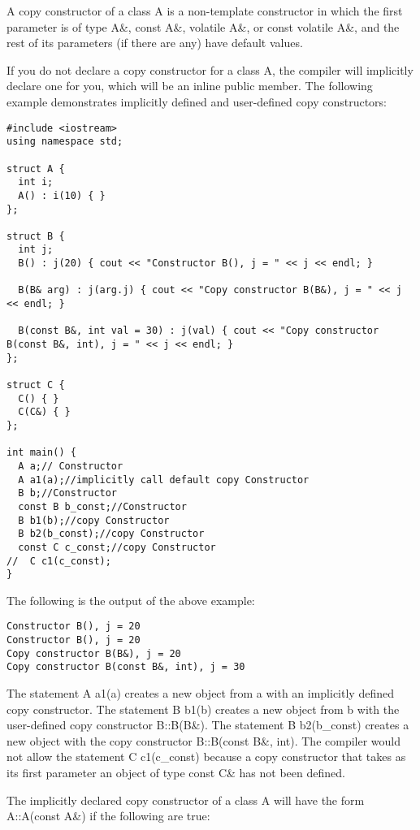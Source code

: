 \documentclass{book}
\begin{document}
A copy constructor of a class A is a non-template constructor in which the first parameter is of type A\&, const A\&, volatile A\&, or const volatile A\&, 
and the rest of its parameters (if there are any) have default values.

If you do not declare a copy constructor for a class A, the compiler will implicitly declare one for you, which will be an inline public member.
The following example demonstrates implicitly defined and user-defined copy constructors:

\begin{lstlisting}
#include <iostream>
using namespace std;

struct A {
  int i;
  A() : i(10) { }
};

struct B {
  int j;
  B() : j(20) { cout << "Constructor B(), j = " << j << endl; }

  B(B& arg) : j(arg.j) { cout << "Copy constructor B(B&), j = " << j << endl; }

  B(const B&, int val = 30) : j(val) { cout << "Copy constructor B(const B&, int), j = " << j << endl; }
};

struct C {
  C() { }
  C(C&) { }
};

int main() {
  A a;// Constructor
  A a1(a);//implicitly call default copy Constructor
  B b;//Constructor
  const B b_const;//Constructor
  B b1(b);//copy Constructor
  B b2(b_const);//copy Constructor
  const C c_const;//copy Constructor
//  C c1(c_const);
}
\end{lstlisting}

The following is the output of the above example:

\begin{lstlisting}
Constructor B(), j = 20
Constructor B(), j = 20
Copy constructor B(B&), j = 20
Copy constructor B(const B&, int), j = 30
\end{lstlisting}

The statement A a1(a) creates a new object from a with an implicitly defined copy constructor.
The statement B b1(b) creates a new object from b with the user-defined copy constructor B::B(B\&). 
The statement B b2(b\_const) creates a new object with the copy constructor B::B(const B\&, int). 
The compiler would not allow the statement C c1(c\_const) because a copy constructor that takes as its first parameter an object of type const C\& has not been defined.

The implicitly declared copy constructor of a class A will have the form A::A(const A\&) if the following are true:
\end{document}
